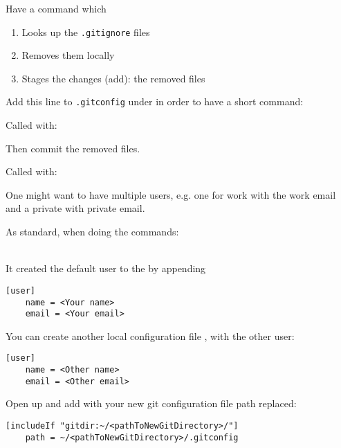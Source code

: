 Have a command which 
\begin{enumerate}
    \item Looks up the \texttt{.gitignore} files
    \item Removes them locally
    \item Stages the changes (add): the removed files
\end{enumerate}

Add this line to \texttt{.gitconfig} under \code{[alias]} in order to have a short command:


Called with: 


Then commit the removed files.\\




Called with:



One might want to have multiple users, e.g. one for work with the work email and a private with private email.

As standard, when doing the commands:\\
\\

It created the default user to the  by appending
\begin{verbatim}
[user]
    name = <Your name>
    email = <Your email>
\end{verbatim}

You can create another local configuration file , with the other user:
\begin{verbatim}
[user]
    name = <Other name>
    email = <Other email>
\end{verbatim}

Open up  and add \code{[includeIf ...]} with your new git configuration file path replaced:
\begin{verbatim}
[includeIf "gitdir:~/<pathToNewGitDirectory>/"]
    path = ~/<pathToNewGitDirectory>/.gitconfig
\end{verbatim}

